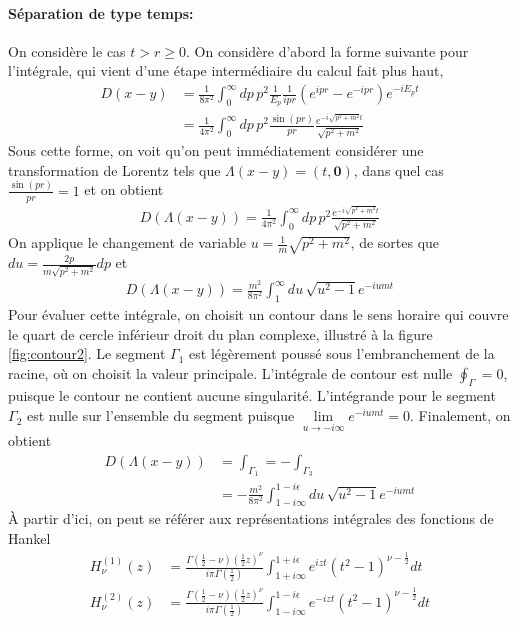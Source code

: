 \documentclass{article}
\numberwithin{equation}{section}
\begin{document}
\paragraph{Séparation de type temps:} On considère le cas $t > r \geq 0$. On considère d'abord la forme suivante pour l'intégrale, qui vient d'une 
étape intermédiaire du calcul fait plus haut, 
\begin{align*}
        D(x - y) &=  \frac{1}{8\pi^2} \int_0^{\infty } dp\, p^2 \frac{1}{E_p} \frac{1}{ipr} (e^{ipr} - e^{-ipr})e^{-iE_pt} \\
                 &= \frac{1}{4\pi^2 } \int_{0}^{\infty } dp\, p^2 \frac{\sin(pr)}{pr}\frac{e^{-i\sqrt{p^2 + m^2}t}}{\sqrt{p^2 + m^2}}
\end{align*} 
Sous cette forme, on voit qu'on peut immédiatement considérer une transformation de Lorentz tels que $\Lambda(x - y) = (t, \mathbf{0})$, 
dans quel cas $\frac{\sin(pr)}{pr} = 1$ et on obtient
\begin{align*}
        D(\Lambda(x - y)) =  \frac{1}{4\pi^2} \int_{0}^{\infty } dp\, p^2 \frac{e^{-i\sqrt{p^2 + m^2}t}}{\sqrt{p^2 + m^2}}
\end{align*}
On applique le changement de variable $u = \frac{1}{m}\sqrt{p^2 + m^2}$, de sortes que $du = \frac{2p}{m\sqrt{p^2 + m^2}}dp$ et 
\begin{align*}
        D(\Lambda(x - y)) =  \frac{m^2}{8\pi^2} \int_{1}^{\infty } du\, \sqrt{u^2 - 1} e^{-iumt}
\end{align*}
Pour évaluer cette intégrale, on choisit un contour dans le sens horaire qui couvre le quart de cercle inférieur droit du plan complexe, illustré à la figure 
\ref{fig:contour2}. Le segment $\Gamma_1$ est légèrement poussé sous l'embranchement de la racine, où on choisit la valeur principale. 
L'intégrale de contour est nulle $\oint_{\Gamma} = 0$, puisque le contour ne contient aucune singularité. 
L'intégrande pour le segment $\Gamma_2$ est nulle sur l'ensemble du segment puisque $\lim\limits_{u \rightarrow  -i \infty }e^{-iumt} = 0$.
Finalement, on obtient
\begin{align*}
        D(\Lambda(x - y)) &=  \int_{\Gamma_1} = - \int_{\Gamma_3} \\
        &= - \frac{m^2}{8\pi^2} \int^{1-i\epsilon}_{1 - i\infty } du\, \sqrt{u^2 - 1} e^{-iumt}
\end{align*}
À partir d'ici, on peut se référer aux représentations intégrales des fonctions de Hankel
\begin{align}
        \label{eq:hankel1}
        H^{(1)}_{\nu}(z) &=  \frac{\Gamma(\frac{1}{2} - \nu) (\frac{1}{2} z)^{\nu}}{i \pi \Gamma(\frac{1}{2})} \int_{1 + i \infty }^{1 + i\epsilon} e^{izt} (t^2 - 1)^{\nu - \frac{1}{2}} dt \\
        \label{eq:hankel2}
        H^{(2)}_{\nu}(z) &=  \frac{\Gamma(\frac{1}{2} - \nu) (\frac{1}{2} z)^{\nu}}{i \pi \Gamma(\frac{1}{2})} \int_{1 - i \infty }^{1 - i\epsilon} e^{-izt} (t^2 - 1)^{\nu - \frac{1}{2}} dt
\end{align}
\end{document}
